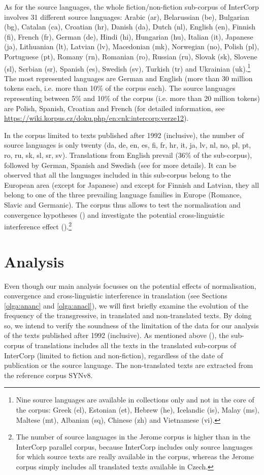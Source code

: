 \documentclass[output=paper,russian]{langsci/langscibook}
\begin{document}
As for the source languages, the whole fiction/non-fiction sub-corpus of InterCorp involves 31 different source languages: Arabic (ar), Belarussian (be), Bulgarian (bg), Catalan (ca), Croatian (hr), Danish (da), Dutch (nl), English (en), Finnish (fi), French (fr), German (de), Hindi (hi), Hungarian (hu), Italian (it), Japanese (ja), Lithuanian (lt), Latvian (lv), Macedonian (mk), Norwegian (no), Polish (pl), Portuguese (pt), Romany (rn), Romanian (ro), Russian (ru), Slovak (sk), Slovene (sl), Serbian (sr), Spanish (es), Swedish (sv), Turkish (tr) and Ukrainian (uk).\footnote{Nine source languages are available in collections only and not in the core of the corpus: Greek (el), Estonian (et), Hebrew (he), Icelandic (is), Malay (ms), Maltese (mt), Albanian (sq), Chinese (zh) and Vietnamese (vi).} The most represented languages are German and English (more than 30 million tokens each, i.e. more than 10\% of the corpus each). The source languages representing between 5\% and 10\% of the corpus (i.e. more than 20 million tokens) are Polish, Spanish, Croatian and French (for detailed information, see \url{https://wiki.korpus.cz/doku.php/en:cnk:intercorp:verze12}).

In the corpus limited to texts published after 1992 (inclusive), the number of source languages is only twenty (da, de, en, es, fi, fr, hr, it, ja, lv, nl, no, pl, pt, ro, ru, sk, sl, sr, sv). Translations from English prevail (36\% of the sub-corpus), followed by German, Spanish and Swedish (see  for more details). It can be observed that all the languages included in this sub-corpus belong to the European area (except for Japanese) and except for Finnish and Latvian, they all belong to one of the three prevailing language families in Europe (Romance, Slavic and Germanic). The corpus thus allows to test the normalisation and convergence hypotheses () and investigate the potential cross-linguistic interference effect ().\footnote{The number of source languages in the Jerome corpus is higher than in the InterCorp parallel corpus, because InterCorp includes only source languages for which source texts are really available in the corpus, whereas the Jerome corpus simply includes all translated texts available in Czech.}

\section{Analysis}\label{olga:ana}

Even though our main analysis focusses on the potential effects of normalisation, convergence and cross-linguistic interference in translation (see Sections \ref{olga:ananc} and \ref{olga:anacl}), we will first briefly examine the evolution of the frequency of the transgressive, in translated and non-translated texts. By doing so, we intend to verify the soundness of the limitation of the data for our analysis of the texts published after 1992 (inclusive). As mentioned above (), the sub-corpus of translations includes all the texts in the translated sub-corpus of InterCorp (limited to fiction and non-fiction), regardless of the date of publication or the source language. The non-translated texts are extracted from the reference corpus SYNv8.
\end{document}
